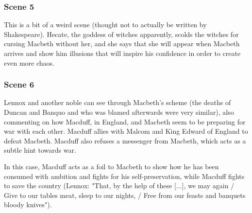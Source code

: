 \subsubsection{Scene 5}

This is a bit of a weird scene (thought not to actually be written by
Shakespeare). Hecate, the goddess of witches apparently, scolds the witches for
cursing Macbeth without her, and she says that she will appear when Macbeth
arrives and show him illusions that will inspire his confidence in order to
create even more chaos.

\subsubsection{Scene 6}

Lennox and another noble can see through Macbeth's scheme (the deaths of Duncan and Banquo and who was blamed afterwards were very similar), also commenting on
how Macduff, in England, and Macbeth seem to be preparing for war with each
other. Macduff allies with Malcom and King Edward of England to defeat Macbeth.
Macduff also refuses a messenger from Macbeth, which acts as a subtle hint
towards war.

In this case, Macduff acts as a foil to Macbeth to show how he has been
consumed with ambition and fights for his self-preservation, while Macduff
fights to save the country (Lennox: "That, by the help of these [...], we may
again / Give to our tables meat, sleep to our nights, / Free from our feasts
and banquets bloody knives").
